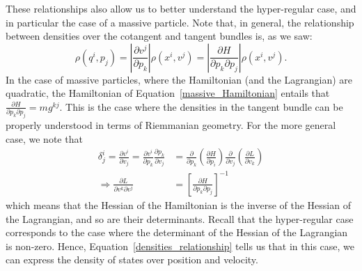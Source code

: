 \documentclass[letterpaper]{article}
\begin{document}
These relationships also allow us to better understand the hyper-regular case, and in particular the case of a massive particle. Note that, in general, the relationship between densities over the cotangent and tangent bundles is, as we saw:
\begin{equation} \label{densities_relationship}
\rho(q^i, p_j) = \left|\frac{\partial v^j}{\partial p_k}\right| \rho(x^i, v^j)  = \left|\frac{\partial H}{\partial p_k \partial p_j}\right| \rho(x^i, v^j).
\end{equation}
In the case of massive particles, where the Hamiltonian (and the Lagrangian) are quadratic, the Hamiltonian of Equation~\ref{massive_Hamiltonian} entails that $\frac{\partial H}{\partial p_k \partial p_j} = m g^{kj}$. This is the case where the densities in the tangent bundle can be properly understood in terms of Riemmanian geometry. For the more general case, we note that
\begin{equation}
\begin{aligned}
\delta^i_j = \frac{\partial v^i}{\partial v_j} = \frac{\partial v^i}{\partial p_k}\frac{\partial p_k}{\partial v_j} &= \frac{\partial}{\partial p_k}\left(\frac{\partial H}{\partial p_i}\right) \frac{\partial }{\partial v_j} \left( \frac{\partial L}{\partial v_k} \right) \\
\Rightarrow \frac{\partial L}{\partial v^k \partial v^j} &= \left[ \frac{\partial H}{\partial p_k \partial p_j} \right]^{-1}
\end{aligned}
\end{equation}
which means that the Hessian of the Hamiltonian is the inverse of the Hessian of the Lagrangian, and so are their determinants. Recall that the hyper-regular case corresponds to the case where the determinant of the Hessian of the Lagrangian is non-zero. Hence, Equation~\ref{densities_relationship} tells us that in this case, we can express the density of states over position and velocity.


\end{document}
